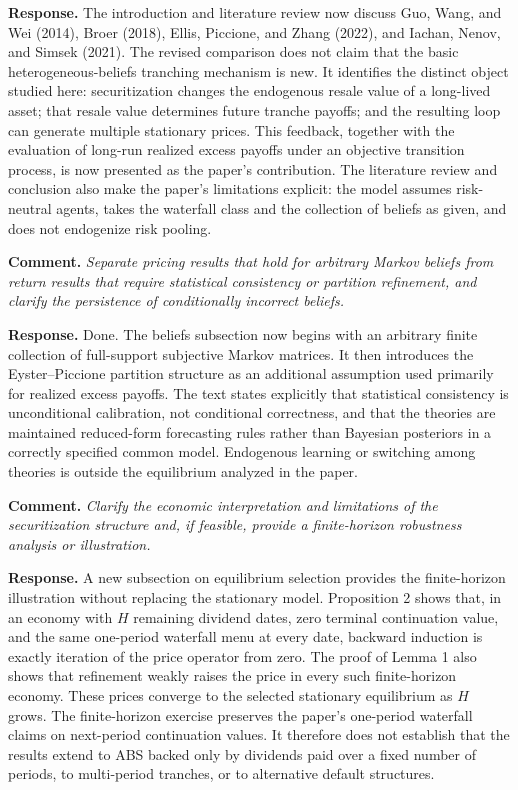 \documentclass[11pt]{article}
\newcommand{\commenttext}[1]{\par\noindent\textbf{Comment.} \textit{#1}\par}
\newcommand{\response}[1]{\par\noindent\textbf{Response.} #1\par}
\begin{document}
\response{The introduction and literature review now discuss Guo, Wang, and Wei (2014), Broer (2018), Ellis, Piccione, and Zhang (2022), and Iachan, Nenov, and Simsek (2021). The revised comparison does not claim that the basic heterogeneous-beliefs tranching mechanism is new. It identifies the distinct object studied here: securitization changes the endogenous resale value of a long-lived asset; that resale value determines future tranche payoffs; and the resulting loop can generate multiple stationary prices. This feedback, together with the evaluation of long-run realized excess payoffs under an objective transition process, is now presented as the paper's contribution. The literature review and conclusion also make the paper's limitations explicit: the model assumes risk-neutral agents, takes the waterfall class and the collection of beliefs as given, and does not endogenize risk pooling.}

\commenttext{Separate pricing results that hold for arbitrary Markov beliefs from return results that require statistical consistency or partition refinement, and clarify the persistence of conditionally incorrect beliefs.}

\response{Done. The beliefs subsection now begins with an arbitrary finite collection of full-support subjective Markov matrices. It then introduces the Eyster--Piccione partition structure as an additional assumption used primarily for realized excess payoffs. The text states explicitly that statistical consistency is unconditional calibration, not conditional correctness, and that the theories are maintained reduced-form forecasting rules rather than Bayesian posteriors in a correctly specified common model. Endogenous learning or switching among theories is outside the equilibrium analyzed in the paper.}

\commenttext{Clarify the economic interpretation and limitations of the securitization structure and, if feasible, provide a finite-horizon robustness analysis or illustration.}

\response{A new subsection on equilibrium selection provides the finite-horizon illustration without replacing the stationary model. Proposition 2 shows that, in an economy with $H$ remaining dividend dates, zero terminal continuation value, and the same one-period waterfall menu at every date, backward induction is exactly iteration of the price operator from zero. The proof of Lemma 1 also shows that refinement weakly raises the price in every such finite-horizon economy. These prices converge to the selected stationary equilibrium as $H$ grows. The finite-horizon exercise preserves the paper's one-period waterfall claims on next-period continuation values. It therefore does not establish that the results extend to ABS backed only by dividends paid over a fixed number of periods, to multi-period tranches, or to alternative default structures.}
\end{document}
